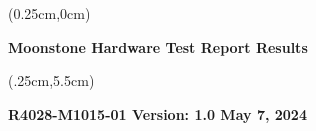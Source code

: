 \documentclass[12pt, a4paper]{article}
\begin{document}
\begin{textblock*}{12cm}(0.25cm,0cm) %
   \color{white}
   \begin{sffamily}
    \begin{flushleft}
        \LARGE\textbf{Moonstone Hardware Test Report Results}
   \end{flushleft}
   \end{sffamily}
\end{textblock*}

\begin{textblock*}{12cm}(.25cm,5.5cm)
\begin{flushleft}
    \begin{sffamily}
        \large\textbf{R4028-M1015-01 \break
        Version: 1.0 \break 
        May 7, 2024 \break}
    \end{sffamily}
\end{flushleft}
\end{textblock*}
\vspace*{-5 cm}
\end{document}
